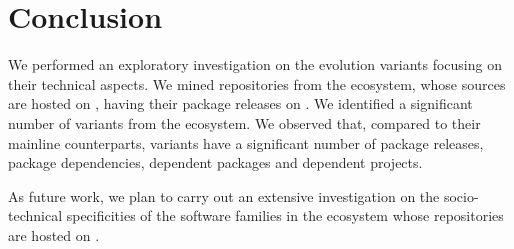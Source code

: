 \section{Conclusion}
\label{sec:conclusion}
We performed an exploratory investigation on the evolution variants focusing on their technical aspects. We mined repositories from the \js ecosystem, whose sources are hosted on \gh, having their package releases on \npm.
We identified a significant number of variants from the \js ecosystem. We observed that, compared to their mainline counterparts, variants have a significant number of package releases, package dependencies, dependent packages and dependent projects.

As future work, we plan to carry out an extensive investigation on the socio-technical specificities of the software families in the \js ecosystem whose repositories are hosted on \gh. 

